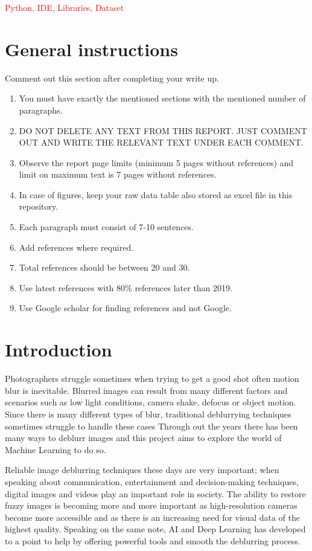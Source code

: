 \documentclass[conference]{IEEEtran}
\begin{document}
\begin{IEEEkeywords}
\textcolor{red}{Python, IDE, Libraries, Dataset}
\end{IEEEkeywords}

\section{General instructions}
Comment out this section after completing your write up.
\begin{enumerate}
\item You must have exactly the mentioned sections with the mentioned number of paragraphs.
\item DO NOT DELETE ANY TEXT FROM THIS REPORT. JUST COMMENT OUT AND WRITE THE RELEVANT TEXT UNDER EACH COMMENT.
\item Observe the report page limits (minimum 5 pages without references) and limit on maximum text is 7 pages without references. 
\item In case of figures, keep your raw data table also stored as excel file in this repository.
\item Each paragraph must consist of 7-10 sentences.
\item Add references where required.
\item Total references should be between 20 and 30.
\item Use latest references with 80\% references later than 2019.
\item Use Google scholar for finding references and not Google.
\end{enumerate}

\section{Introduction}
Photographers struggle sometimes when trying to get a good shot often motion blur is inevitable. 
Blurred images can result from many different factors and scenarios such as low light conditions, camera shake, defocus or object motion.
Since there is many different types of blur, traditional deblurrying techniques sometimes struggle to handle these cases
Through out the years there has been many ways to deblurr images and this project aims to explore the world of Machine Learning to do so.

Reliable image deblurring techniques these days are very important; when speaking about communication, entertainment and decision-making techniques, digital images and videos play an important role in society. 
The ability to restore fuzzy images is becoming more and more important as high-resolution cameras become more accessible and as there is an increasing need for visual data of the highest quality. 
Speaking on the same note, AI and Deep Learning has developed to a point to help by offering powerful tools and smooth the deblurring process.
\end{document}
